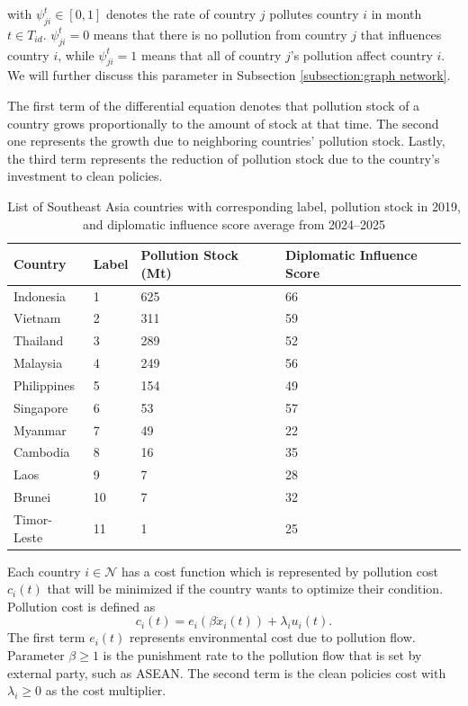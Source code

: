 \documentclass[a4paper,fleqn]{cas-dc}
\begin{document}
with $\psi_{ji}^t\in [0,1]$ denotes the rate of country $j$ pollutes country $i$ in month $t\in T_{id}$. $\psi_{ji}^t=0$ means that there is no pollution from country $j$ that influences country $i$, while $\psi_{ji}^t=1$ means that all of country $j$'s pollution affect country $i$. We will further discuss this parameter in Subsection \ref{subsection:graph network}.

The first term of the differential equation denotes that pollution stock of a country grows proportionally to the amount of stock at that time. The second one represents the growth due to neighboring countries' pollution stock. Lastly, the third term represents the reduction of pollution stock due to the country's investment to clean policies.

\begin{table}[h]
    \caption{List of Southeast Asia countries with corresponding label, pollution stock in 2019, and diplomatic influence score average from 2024--2025}
    \label{table:label}
    \centering
    \begin{tabular*}{\tblwidth}{@{}llp{2cm}p{2.5cm}@{}}
    \toprule
    Country & Label & Pollution Stock (Mt) & Diplomatic Influence Score \\
    \midrule
    Indonesia   & 1 & 625 & 66      \\
    Vietnam     & 2 & 311 & 59      \\
    Thailand    & 3 & 289 & 52      \\
    Malaysia    & 4 & 249 & 56      \\
    Philippines & 5 & 154 & 49      \\
    Singapore   & 6 & 53  & 57      \\
    Myanmar     & 7 & 49  & 22      \\
    Cambodia    & 8 & 16  & 35      \\
    Laos        & 9 & 7   & 28      \\
    Brunei      & 10 & 7  & 32      \\
    Timor-Leste & 11 & 1  & 25      \\
    \bottomrule
    \end{tabular*}
\end{table}

Each country $i\in \mathcal{N}$ has a cost function which is represented by pollution cost $c_i(t)$ that will be minimized if the country wants to optimize their condition. Pollution cost is defined as
\begin{equation}
    c_i(t) = e_i(\beta \dot{x}_i(t)) + \lambda_i u_i(t).
\end{equation}
The first term $e_i(t)$ represents environmental cost due to pollution flow. Parameter $\beta \geq 1$ is the punishment rate to the pollution flow that is set by external party, such as ASEAN. The second term is the clean policies cost with $\lambda_i \geq 0$ as the cost multiplier.
\end{document}
